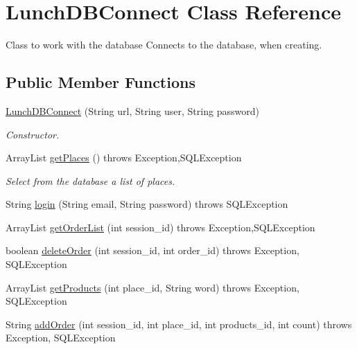 \hypertarget{classLunchDBConnect}{\section{Lunch\-D\-B\-Connect Class Reference}
\label{classLunchDBConnect}
}


Class to work with the database  Connects to the database, when creating.  


\subsection*{Public Member Functions}
\begin{DoxyCompactItemize}
\item 
\hyperlink{classLunchDBConnect_a0733140a8c041be1ee93f8c57ecde0c5}{Lunch\-D\-B\-Connect} (String url, String user, String password)
\begin{DoxyCompactList}\small\item\em Constructor. \end{DoxyCompactList}\item 
Array\-List \hyperlink{classLunchDBConnect_a0fb977cd02885fed4ec85778fb572572}{get\-Places} ()  throws Exception,\-S\-Q\-L\-Exception 
\begin{DoxyCompactList}\small\item\em Select from the database a list of places. \end{DoxyCompactList}\item 
String \hyperlink{classLunchDBConnect_afbee1733687dd347e3edb97760b42e8b}{login} (String email, String password)  throws S\-Q\-L\-Exception 
\item 
Array\-List \hyperlink{classLunchDBConnect_a7e8b49ef8eaf872668f0542e540c52e8}{get\-Order\-List} (int session\-\_\-id)  throws Exception,\-S\-Q\-L\-Exception 
\item 
boolean \hyperlink{classLunchDBConnect_aeaebc7f01d4b720647309d3ef6dba638}{delete\-Order} (int session\-\_\-id, int order\-\_\-id)  throws Exception, S\-Q\-L\-Exception 
\item 
Array\-List \hyperlink{classLunchDBConnect_a1ee913364bce20e940a01e3c8ff35e13}{get\-Products} (int place\-\_\-id, String word)  throws Exception, S\-Q\-L\-Exception 
\item 
String \hyperlink{classLunchDBConnect_a773fdaed5b7842d1de1fd1a7c21c6db8}{add\-Order} (int session\-\_\-id, int place\-\_\-id, int products\-\_\-id, int count)  throws Exception, S\-Q\-L\-Exception 
\item 

\end{DoxyCompactItemize}
